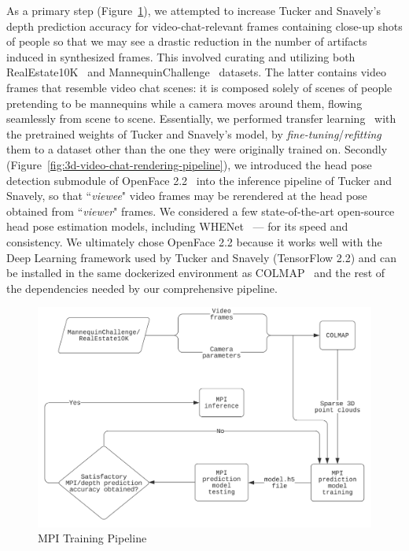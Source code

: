 As a primary step (Figure~\ref{fig:mpi-training-pipeline}), we attempted to increase Tucker and Snavely's depth prediction accuracy for video-chat-relevant frames containing close-up shots of people so that we may see a drastic reduction in the number of artifacts induced in synthesized frames. This involved curating and utilizing both RealEstate10K~\cite{zhou2018stereo} and MannequinChallenge~\cite{li2019learning} datasets. The latter contains video frames that resemble video chat scenes: it is composed solely of scenes of people pretending to be mannequins while a camera moves around them, flowing seamlessly from scene to scene. Essentially, we performed transfer learning~\cite{radhakrishnan_what_2019} with the pretrained weights of Tucker and Snavely's model, by \textit{fine-tuning}/\textit{refitting} them to a dataset other than the one they were originally trained on. Secondly (Figure~\ref{fig:3d-video-chat-rendering-pipeline}), we introduced the head pose detection submodule of OpenFace 2.2~\cite{baltrusaitis_openface_2018} into the inference pipeline of Tucker and Snavely, so that ``\textit{viewee}" video frames may be rerendered at the head pose obtained from ``\textit{viewer}" frames. We considered a few state-of-the-art open-source head pose estimation models, including WHENet~\cite{zhou_whenet_2020} --- for its speed and consistency. We ultimately chose OpenFace 2.2 because it works well with the Deep Learning framework used by Tucker and Snavely (TensorFlow 2.2) and can be installed in the same dockerized environment as COLMAP~\cite{schoenberger2016sfm,schoenberger2016mvs} and the rest of the dependencies needed by our comprehensive pipeline. 

\begin{figure}[!h]
    \includegraphics[width=1\columnwidth]{figures/mpi-training-pipeline.png}
    \caption{MPI Training Pipeline}
    \label{fig:mpi-training-pipeline}
\end{figure}

